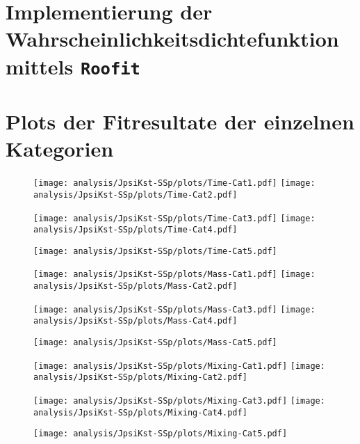
\makebibliography
\newpage

\appendix

\section{Implementierung der Wahrscheinlichkeitsdichtefunktion mittels \texttt{Roofit}}




\section{Plots der Fitresultate der einzelnen Kategorien}

\begin{figure}
  \texttt{[image: analysis/JpsiKst-SSp/plots/Time-Cat1.pdf]}
  \texttt{[image: analysis/JpsiKst-SSp/plots/Time-Cat2.pdf]}
\end{figure}
\begin{figure}
  \texttt{[image: analysis/JpsiKst-SSp/plots/Time-Cat3.pdf]}
  \texttt{[image: analysis/JpsiKst-SSp/plots/Time-Cat4.pdf]}
\end{figure}
\begin{figure}
  \centering
  \texttt{[image: analysis/JpsiKst-SSp/plots/Time-Cat5.pdf]}
\end{figure}
\begin{figure}
  \texttt{[image: analysis/JpsiKst-SSp/plots/Mass-Cat1.pdf]}
  \texttt{[image: analysis/JpsiKst-SSp/plots/Mass-Cat2.pdf]}
\end{figure}
\begin{figure}
  \texttt{[image: analysis/JpsiKst-SSp/plots/Mass-Cat3.pdf]}
  \texttt{[image: analysis/JpsiKst-SSp/plots/Mass-Cat4.pdf]}
\end{figure}
\begin{figure}
  \centering
  \texttt{[image: analysis/JpsiKst-SSp/plots/Mass-Cat5.pdf]}
\end{figure}

\begin{figure}
  \texttt{[image: analysis/JpsiKst-SSp/plots/Mixing-Cat1.pdf]}
  \texttt{[image: analysis/JpsiKst-SSp/plots/Mixing-Cat2.pdf]}
\end{figure}
\begin{figure}
  \texttt{[image: analysis/JpsiKst-SSp/plots/Mixing-Cat3.pdf]}
  \texttt{[image: analysis/JpsiKst-SSp/plots/Mixing-Cat4.pdf]}
\end{figure}
\begin{figure}
  \centering
  \texttt{[image: analysis/JpsiKst-SSp/plots/Mixing-Cat5.pdf]}
\end{figure}
